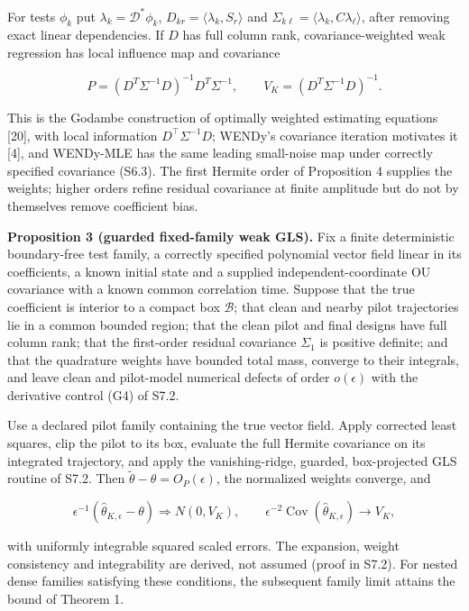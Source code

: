 \documentclass[ejs]{imsart}
\begin{document}
For tests \(\phi_k\) put \(\lambda_k=\mathcal D^*\phi_k\),
\(D_{kr}=\langle\lambda_k,S_r\rangle\) and
\(\Sigma_{k\ell}=\langle\lambda_k,C\lambda_\ell\rangle\), after removing
exact linear dependencies. If \(D\) has full column rank,
covariance-weighted weak regression has local influence map and
covariance

\[
P=(D^T\Sigma^{-1}D)^{-1}D^T\Sigma^{-1},\qquad
V_K=(D^T\Sigma^{-1}D)^{-1}.
\]

This is the Godambe construction of optimally weighted estimating
equations {[}20{]}, with local information \(D^\top\Sigma^{-1}D\);
WENDy's covariance iteration motivates it {[}4{]}, and WENDy-MLE has the
same leading small-noise map under correctly specified covariance
(S6.3). The first Hermite order of Proposition 4 supplies the weights;
higher orders refine residual covariance at finite amplitude but do not
by themselves remove coefficient bias.

\textbf{Proposition 3 (guarded fixed-family weak GLS).} Fix a finite
deterministic boundary-free test family, a correctly specified
polynomial vector field linear in its coefficients, a known initial
state and a supplied independent-coordinate OU covariance with a known
common correlation time. Suppose that the true coefficient is interior
to a compact box \(\mathcal B\); that clean and nearby pilot
trajectories lie in a common bounded region; that the clean pilot and
final designs have full column rank; that the first-order residual
covariance \(\Sigma_1\) is positive definite; and that the quadrature
weights have bounded total mass, converge to their integrals, and leave
clean and pilot-model numerical defects of order \(o(\epsilon)\) with
the derivative control (G4) of S7.2.

Use a declared pilot family containing the true vector field. Apply
corrected least squares, clip the pilot to its box, evaluate the full
Hermite covariance on its integrated trajectory, and apply the
vanishing-ridge, guarded, box-projected GLS routine of S7.2. Then
\(\widetilde\theta-\theta=O_P(\epsilon)\), the normalized weights
converge, and

\[
\epsilon^{-1}(\widehat\theta_{K,\epsilon}-\theta)\Rightarrow N(0,V_K),\qquad
\epsilon^{-2}\operatorname{Cov}(\widehat\theta_{K,\epsilon})\to V_K,
\]

with uniformly integrable squared scaled errors. The expansion, weight
consistency and integrability are derived, not assumed (proof in S7.2).
For nested dense families satisfying these conditions, the subsequent
family limit attains the bound of Theorem 1.
\end{document}
